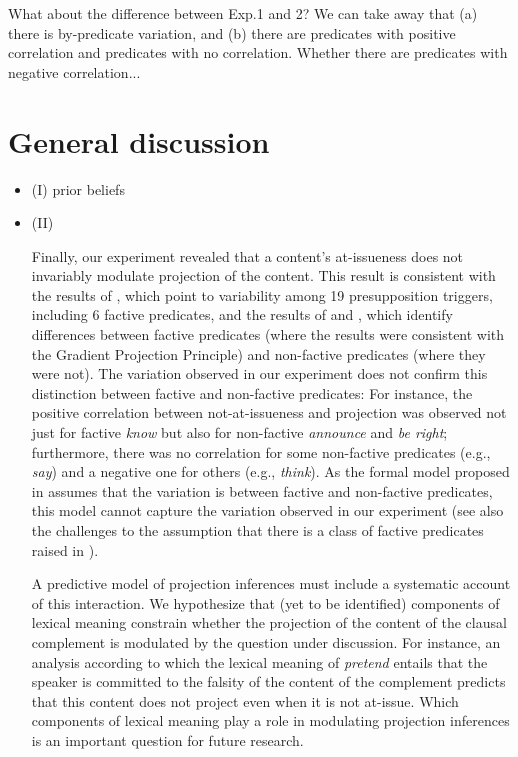 \documentclass[11pt,fleqn]{article}
\newcommand{\6}{\mbox{$[\hspace*{-.6mm}[$}}
\newcommand{\9}{\mbox{$]\hspace*{-.6mm}]$}}
\begin{document}
What about the difference between Exp.1 and 2? We can take away that (a) there is by-predicate variation, and (b) there are predicates with positive correlation and predicates with no correlation. Whether there are predicates with negative correlation...

\section{General discussion}\label{s4}

\begin{itemize}

\item (I) prior beliefs

\item(II) \citealt{stevens-etal2017,tonhauser-etal-sub23}

Finally, our experiment revealed that a content's at-issueness does not invariably modulate projection of the content.  This result is consistent with the results of \citealt{cummins-rohde2015}, which point to variability among 19 presupposition triggers, including 6 factive predicates, and the results of \citealt{djaerv-bacovcin-salt27, djaerv-bacovcin2020} and \citealt{mahler-etal2020}, which identify differences between factive predicates (where the results were consistent with the Gradient Projection Principle) and non-factive predicates (where they were not). The variation observed in our experiment does not confirm this distinction between factive and non-factive predicates: For instance, the positive correlation between not-at-issueness and projection was observed not just for factive {\em know} but also for non-factive {\em announce} and {\em be right}; furthermore, there was no correlation for some non-factive predicates (e.g., {\em say}) and a negative one for others (e.g., {\em think}). As the formal model proposed in \citealt{djaerv-bacovcin2020} assumes that the  variation is between factive and non-factive predicates, this model cannot capture the variation observed in our experiment (see also the challenges to the assumption that there is a class of factive predicates raised in \citealt{degen-tonhauser-language}).

A predictive model of projection inferences must include a systematic account of this interaction. We hypothesize that (yet to be identified) components of lexical meaning constrain whether the projection of the content of the clausal complement is modulated by the question under discussion. For instance, an analysis according to which the lexical meaning of {\em pretend} entails that the speaker is committed to the falsity of the content of the complement predicts that this content does not project even when it is not at-issue. Which components of lexical meaning play a role in modulating projection inferences is an important question for future research.


\end{itemize}
\end{document}
